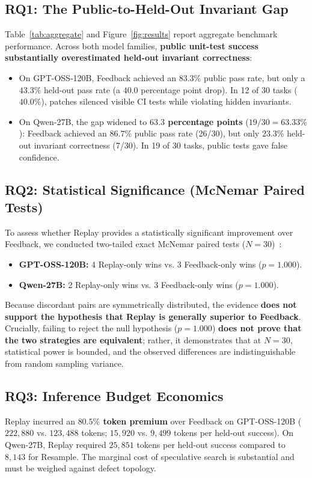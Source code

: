 \documentclass[10pt,twocolumn,letterpaper]{article}
\begin{document}
\subsection{RQ1: The Public-to-Held-Out Invariant Gap}
Table~\ref{tab:aggregate} and Figure~\ref{fig:results} report aggregate benchmark performance. Across both model families, \textbf{public unit-test success substantially overestimated held-out invariant correctness}:
\begin{itemize}
    \item On GPT-OSS-120B, Feedback achieved an $83.3\%$ public pass rate, but only a $43.3\%$ held-out pass rate (a $40.0$ percentage point drop). In 12 of 30 tasks ($40.0\%$), patches silenced visible CI tests while violating hidden invariants.
    \item On Qwen-27B, the gap widened to \textbf{$63.3$ percentage points} ($19/30 = 63.33\%$): Feedback achieved an $86.7\%$ public pass rate (26/30), but only $23.3\%$ held-out invariant correctness (7/30). In 19 of 30 tasks, public tests gave false confidence.
\end{itemize}

\subsection{RQ2: Statistical Significance (McNemar Paired Tests)}
To assess whether Replay provides a statistically significant improvement over Feedback, we conducted two-tailed exact McNemar paired tests ($N = 30$)~\cite{mcnemar1947note}:
\begin{itemize}
    \item \textbf{GPT-OSS-120B:} 4 Replay-only wins vs. 3 Feedback-only wins ($p = 1.000$).
    \item \textbf{Qwen-27B:} 2 Replay-only wins vs. 3 Feedback-only wins ($p = 1.000$).
\end{itemize}
Because discordant pairs are symmetrically distributed, the evidence \textbf{does not support the hypothesis that Replay is generally superior to Feedback}. Crucially, failing to reject the null hypothesis ($p = 1.000$) \textbf{does not prove that the two strategies are equivalent}; rather, it demonstrates that at $N = 30$, statistical power is bounded, and the observed differences are indistinguishable from random sampling variance.

\subsection{RQ3: Inference Budget Economics}
Replay incurred an \textbf{$80.5\%$ token premium} over Feedback on GPT-OSS-120B ($222,880$ vs. $123,488$ tokens; $15,920$ vs. $9,499$ tokens per held-out success). On Qwen-27B, Replay required $25,851$ tokens per held-out success compared to $8,143$ for Resample. The marginal cost of speculative search is substantial and must be weighed against defect topology.
\end{document}
